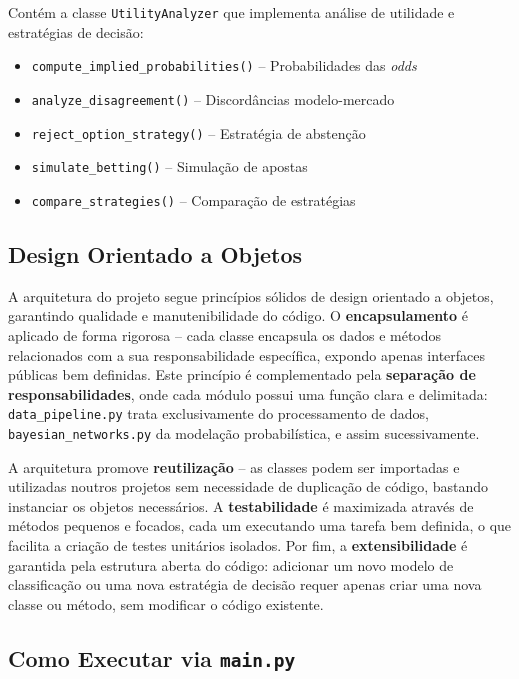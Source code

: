 \documentclass[12pt, a4paper]{article}
\begin{document}
Contém a classe \texttt{UtilityAnalyzer} que implementa análise de utilidade e estratégias de decisão:

\begin{itemize}
  \item \texttt{compute\_implied\_probabilities()} -- Probabilidades das \textit{odds}
  \item \texttt{analyze\_disagreement()} -- Discordâncias modelo-mercado
  \item \texttt{reject\_option\_strategy()} -- Estratégia de abstenção
  \item \texttt{simulate\_betting()} -- Simulação de apostas
  \item \texttt{compare\_strategies()} -- Comparação de estratégias
\end{itemize}

\subsection{Design Orientado a Objetos}

A arquitetura do projeto segue princípios sólidos de design orientado a objetos, garantindo qualidade e manutenibilidade do código. O \textbf{encapsulamento} é aplicado de forma rigorosa -- cada classe encapsula os dados e métodos relacionados com a sua responsabilidade específica, expondo apenas interfaces públicas bem definidas. Este princípio é complementado pela \textbf{separação de responsabilidades}, onde cada módulo possui uma função clara e delimitada: \texttt{data\_pipeline.py} trata exclusivamente do processamento de dados, \texttt{bayesian\_networks.py} da modelação probabilística, e assim sucessivamente.

A arquitetura promove \textbf{reutilização} -- as classes podem ser importadas e utilizadas noutros projetos sem necessidade de duplicação de código, bastando instanciar os objetos necessários. A \textbf{testabilidade} é maximizada através de métodos pequenos e focados, cada um executando uma tarefa bem definida, o que facilita a criação de testes unitários isolados. Por fim, a \textbf{extensibilidade} é garantida pela estrutura aberta do código: adicionar um novo modelo de classificação ou uma nova estratégia de decisão requer apenas criar uma nova classe ou método, sem modificar o código existente.

\subsection{Como Executar via \texttt{main.py}}
\end{document}

